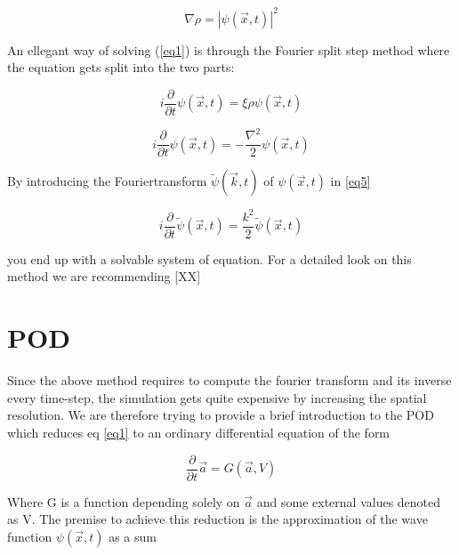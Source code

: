 \documentclass[usenatbib]{mn2e}
\begin{document}
\begin{equation} \label{eq2}
\nabla \rho =\left| \psi\left( \overrightarrow {x},t\right) \right| ^{2}
\end{equation}

An ellegant way of solving (\ref{eq1}) is through the Fourier split step method where the equation gets split into the two parts:

\begin{equation} \label{eq4}
i\dfrac {\partial } {\partial t}\psi( \overrightarrow{x},t) = \xi  \rho  \psi( \overrightarrow {x},t)
\end{equation}

\begin{equation} \label{eq5}
i\dfrac {\partial } {\partial t}\psi( \overrightarrow{x},t) = -\dfrac {\nabla ^{2}} {2} \psi( \overrightarrow {x},t)
\end{equation}

By introducing the Fouriertransform \(\widetilde{\psi} (\overrightarrow {k},t)\) of \(\psi (\overrightarrow {x},t)\) in \ref{eq5} 

\begin{equation} \label{eq6}
i\dfrac {\partial } {\partial t}\widetilde{\psi}( \overrightarrow{x},t) = \dfrac {k ^{2}} {2} \widetilde{\psi}( \overrightarrow {x},t)
\end{equation}

you end up with a solvable system of equation. For a detailed look on this method we are recommending [XX]

\section{POD}
Since the above method requires to compute the fourier transform and its inverse every time-step, the simulation gets quite expensive by increasing the spatial resolution. We are therefore trying to provide a brief introduction to the POD which reduces eq \ref{eq1} to an ordinary differential equation of the form 

\begin{equation}\label{eq7}
\dfrac {\partial } {\partial t} \overrightarrow{a} = G( \overrightarrow{a},V)
\end{equation} 

Where G is a function depending solely on \(\overrightarrow{a}\) and some external values denoted as V. The premise to achieve this reduction is the approximation of the wave function \(\psi( \overrightarrow {x},t)\) as a  sum
\end{document}
